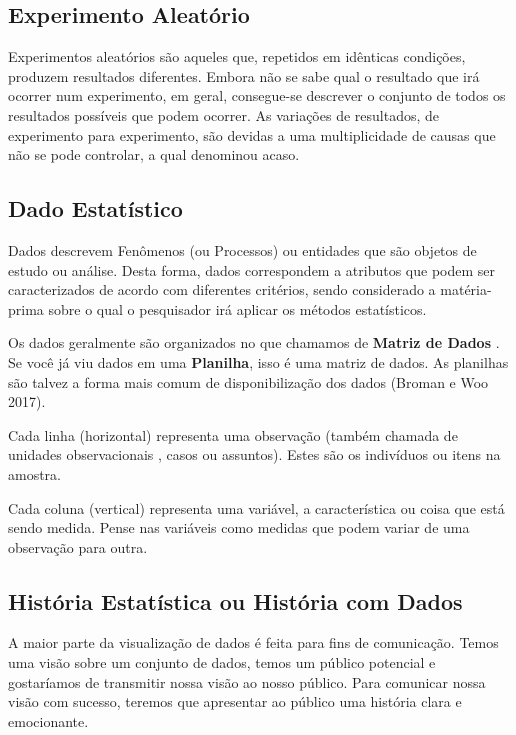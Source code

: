 \subsection{Experimento Aleatório}

\inic Experimentos aleatórios são aqueles que, repetidos em idênticas condições, produzem resultados diferentes. Embora não se sabe qual o resultado que irá ocorrer num experimento, em geral, consegue-se descrever o conjunto de todos os resultados possíveis que podem ocorrer. As variações de resultados, de experimento para experimento, são devidas a uma multiplicidade de causas que não se pode controlar, a qual denominou acaso.

\subsection{Dado Estatístico}

Dados descrevem Fenômenos (ou Processos) ou entidades que são objetos de estudo ou análise. Desta forma, dados correspondem a atributos que podem ser caracterizados de acordo com diferentes critérios, sendo considerado a matéria-prima sobre o qual o pesquisador irá aplicar os métodos estatísticos.\vskip0.3cm

Os dados geralmente são organizados no que chamamos de \textbf{Matriz de Dados} . Se você já viu dados em uma \textbf{Planilha}, isso é uma matriz de dados. As planilhas são talvez a forma mais comum de disponibilização dos dados (Broman e Woo 2017).\vskip0.3cm



Cada linha (horizontal) representa uma observação (também chamada de unidades observacionais , casos ou assuntos). Estes são os indivíduos ou itens na amostra.\vskip0.3cm

Cada coluna (vertical) representa uma variável, a característica ou coisa que está sendo medida. Pense nas variáveis como medidas que podem variar de uma observação para outra.



\subsection{História Estatística ou História com Dados}

A maior parte da visualização de dados é feita para fins de comunicação. Temos uma visão sobre um conjunto de dados, temos um público potencial e gostaríamos de transmitir nossa visão ao nosso público. Para comunicar nossa visão com sucesso, teremos que apresentar ao público uma história clara e emocionante. \vskip0.3cm

